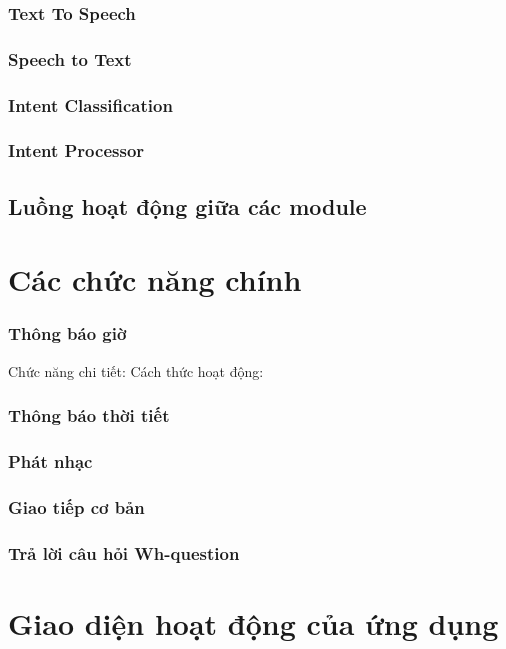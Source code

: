 \subsubsection{Text To Speech}
\subsubsection{Speech to Text}
\subsubsection{Intent Classification}
\subsubsection{Intent Processor}
\subsection{Luồng hoạt động giữa các module}

\section{Các chức năng chính}
\subsubsection{Thông báo giờ}
Chức năng chi tiết:
Cách thức hoạt động:
\subsubsection{Thông báo thời tiết}
\subsubsection{Phát nhạc}
\subsubsection{Giao tiếp cơ bản}
\subsubsection{Trả lời câu hỏi Wh-question}

\section{Giao diện hoạt động của ứng dụng}

